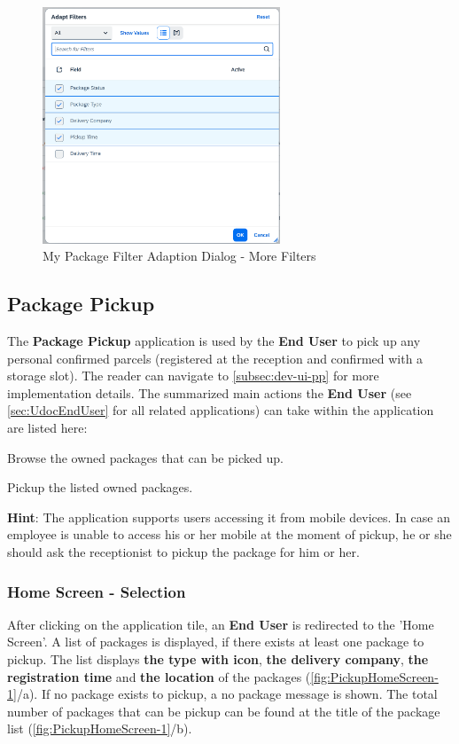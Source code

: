 \begin{figure}[H]
	\centering
	\includegraphics[height=200pt]{images/user_doc/myPack/MoreFIlterOption.png}
	\caption{My Package Filter Adaption Dialog - More Filters}
	\label{fig:mpMOreFilterAdaption}
\end{figure}
% 

\subsection{Package Pickup}
\label{subsec:pp}

The \textbf{Package Pickup} application is used by the \textbf{End User} to pick up any personal confirmed parcels (registered at the reception and confirmed with a storage slot). The reader can navigate to \autoref{subsec:dev-ui-pp} for more implementation details. 
The summarized main actions the \textbf{End User} (see \autoref{sec:UdocEndUser} for all related applications) can take within the application are listed here:
\begin{compactenum}
	\item Browse the owned packages that can be picked up.
    \item Pickup the listed owned packages.
\end{compactenum}

\noindent
\textbf{Hint}: The application supports users accessing it from mobile devices. In case an employee is unable to access his or her mobile at the moment of pickup, he or she should ask the receptionist to pickup the package for him or her.


\subsubsection{Home Screen - Selection}
After clicking on the application tile, an \textbf{End User} is redirected to the 'Home Screen'. A list of packages is displayed, if there exists at least one package to pickup. 
The list displays \textbf{the type with icon}, \textbf{the delivery company}, \textbf{the registration time} and \textbf{the location} of the packages (\autoref{fig:PickupHomeScreen-1}/a). 
If no package exists to pickup, a no package message is shown. 
The total number of packages that can be pickup can be found at the title of the package list (\autoref{fig:PickupHomeScreen-1}/b).

